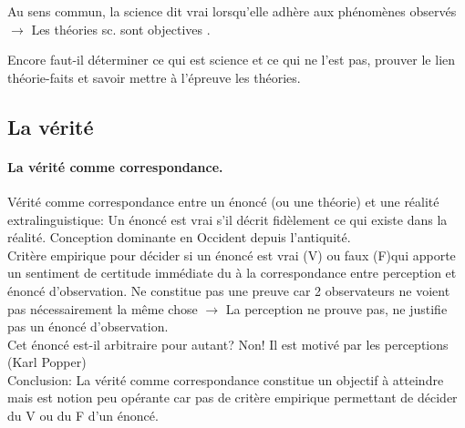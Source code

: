 \documentclass{report}
\begin{document}
	Au sens commun, la science dit \og vrai \fg lorsqu’elle adhère aux phénomènes observés $\rightarrow$ Les théories sc. sont \og objectives \fg{}.
	
	Encore faut-il déterminer ce qui est science et ce qui ne l'est pas, prouver le lien théorie-faits et savoir mettre à l'épreuve les théories.
	
	\subsection{La vérité}
	
	\paragraph{La vérité comme correspondance.} Vérité comme correspondance entre un énoncé (ou une théorie) et une réalité extralinguistique: Un énoncé est vrai s’il décrit fidèlement ce qui existe dans la réalité. Conception dominante en Occident depuis l’antiquité.\\
	Critère empirique pour décider si un énoncé est vrai (V) ou faux (F)qui apporte un sentiment de certitude immédiate du à la correspondance entre perception et énoncé d’observation.
	Ne constitue pas une preuve car 2 observateurs ne voient pas nécessairement la même chose $\rightarrow$ La perception ne \og prouve \fg pas, ne \og justifie \fg pas un énoncé d’observation.\\
	Cet énoncé est-il arbitraire pour autant? Non! Il est \og motivé \fg par les perceptions (Karl Popper)\\
	Conclusion: La vérité comme correspondance constitue un objectif à atteindre mais est notion peu opérante car pas de critère empirique permettant de décider du V ou du F d’un énoncé.
	
\end{document}

